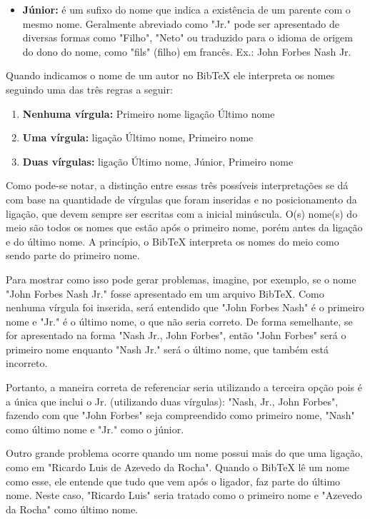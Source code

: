 \begin{anexosenv}
\begin{itemize}
\item \textbf{Júnior:} é um sufixo do nome que indica a existência de um parente com o mesmo nome. Geralmente abreviado como "Jr."{} pode ser apresentado de diversas formas como "Filho"{}, "Neto"{} ou traduzido para o idioma de origem do dono do nome, como "fils"{} (filho) em francês. Ex.: John Forbes Nash Jr.
\end{itemize}

Quando indicamos o nome de um autor no BibTeX ele interpreta os nomes seguindo uma das três regras a seguir:

\begin{enumerate}
    \item \textbf{Nenhuma vírgula:} {Primeiro nome} {ligação} {Último nome}

    \item \textbf{Uma vírgula:} {ligação} {Último nome}, {Primeiro nome}

    \item \textbf{Duas vírgulas:} {ligação} {Último nome}, {Júnior}, {Primeiro nome}
\end{enumerate}

Como pode-se notar, a distinção entre essas três possíveis interpretações se dá com base na quantidade de vírgulas que foram inseridas e no posicionamento da ligação, que devem sempre ser escritas com a inicial minúscula. O(s) nome(s) do meio são todos os nomes que estão após o primeiro nome, porém antes da ligação e do último nome. A princípio, o BibTeX interpreta os nomes do meio como sendo parte do primeiro nome.

Para mostrar como isso pode gerar problemas, imagine, por exemplo, se o nome "John Forbes Nash Jr."{} fosse apresentado em um arquivo BibTeX. Como nenhuma vírgula foi inserida, será entendido que "John Forbes Nash"{} é o primeiro nome e "Jr."{} é o último nome, o que não seria correto. De forma semelhante, se for apresentado na forma "Nash Jr., John Forbes", então "John Forbes"{} será o primeiro nome enquanto "Nash Jr."{} será o último nome, que também está incorreto.

Portanto, a maneira correta de referenciar seria utilizando a terceira opção pois é a única que inclui o Jr. (utilizando duas vírgulas): "Nash, Jr., John Forbes"{}, fazendo com que "John Forbes"{} seja compreendido como primeiro nome, "Nash"{} como último nome e "Jr."{} como o júnior.

Outro grande problema ocorre quando um nome possui mais do que uma ligação, como em "Ricardo Luis de Azevedo da Rocha"{}. Quando o BibTeX lê um nome como esse, ele entende que tudo que vem após o ligador, faz parte do último nome. Neste caso, "Ricardo Luis"{} seria tratado como o primeiro nome e "Azevedo da Rocha"{} como último nome.


\end{anexosenv}
